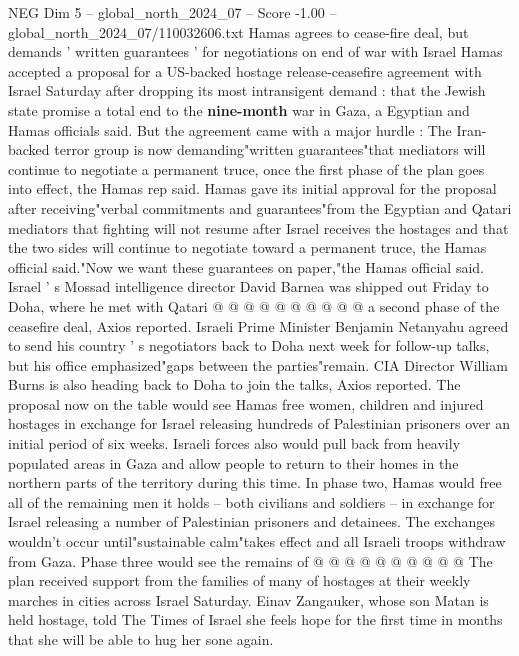 \begin{textsample}{NEG Dim 5 – global\_north\_2024\_07 – Score -1.00 – global\_north\_2024\_07/110032606.txt}  \label{ex:f5_neg_143}
Hamas agrees to cease-fire deal, but demands ' written guarantees ' for negotiations on end of war with Israel Hamas accepted a proposal for a US-backed hostage release-ceasefire agreement with Israel Saturday after dropping its most intransigent demand : that the Jewish state promise a total end to the \textbf{nine-month} war in Gaza, a Egyptian and Hamas officials said.
But the agreement came with a major hurdle : The Iran-backed terror group is now demanding"written guarantees"that mediators will continue to negotiate a permanent truce, once the first phase of the plan goes into effect, the Hamas rep said.
Hamas gave its initial approval for the proposal after receiving"verbal commitments and guarantees"from the Egyptian and Qatari mediators that fighting will not resume after Israel receives the hostages and that the two sides will continue to negotiate toward a permanent truce, the Hamas official said."Now we want these guarantees on paper,"the Hamas official said.
Israel ' s Mossad intelligence director David Barnea was shipped out Friday to Doha, where he met with Qatari @ @ @ @ @ @ @ @ @ @ a second phase of the ceasefire deal, Axios reported.
Israeli Prime Minister Benjamin Netanyahu agreed to send his country ' s negotiators back to Doha next week for follow-up talks, but his office emphasized"gaps between the parties"remain.
CIA Director William Burns is also heading back to Doha to join the talks, Axios reported.
The proposal now on the table would see Hamas free women, children and injured hostages in exchange for Israel releasing hundreds of Palestinian prisoners over an initial period of six weeks.
Israeli forces also would pull back from heavily populated areas in Gaza and allow people to return to their homes in the northern parts of the territory during this time.
In phase two, Hamas would free all of the remaining men it holds -- both civilians and soldiers -- in exchange for Israel releasing a number of Palestinian prisoners and detainees.
The exchanges wouldn't occur until"sustainable calm"takes effect and all Israeli troops withdraw from Gaza.
Phase three would see the remains of @ @ @ @ @ @ @ @ @ @ The plan received support from the families of many of hostages at their weekly marches in cities across Israel Saturday.
Einav Zangauker, whose son Matan is held hostage, told The Times of Israel she feels hope for the first time in months that she will be able to hug her sone again.

\end{textsample}
